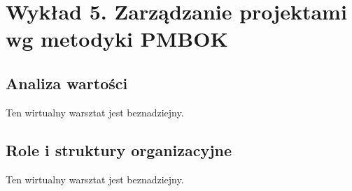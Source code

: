 \chapter{Wykład 5. Zarządzanie projektami wg metodyki PMBOK}

\section{Analiza wartości}

Ten wirtualny warsztat jest beznadziejny.


\section{Role i struktury organizacyjne}

Ten wirtualny warsztat jest beznadziejny.


